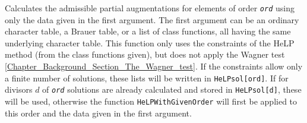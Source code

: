 \documentclass[a4paper,11pt]{report}
\begin{document}
{{{ Calculates the admissible partial augmentations for elements of order \mbox{\texttt{\mdseries\slshape ord}} using only the data given in the first argument. The first argument can be an
ordinary character table, a Brauer table, or a list of class functions, all
having the same underlying character table. This function only uses the
constraints of the HeLP method (from the class functions given), but does not
apply the Wagner test \ref{Chapter_Background_Section_The_Wagner_test}. If the constraints allow only a finite number of solutions, these lists will
be written in \texttt{HeLP{\textunderscore}sol[ord]}. If for divisors $d$ of \mbox{\texttt{\mdseries\slshape ord}} solutions are already calculated and stored in \texttt{HeLP{\textunderscore}sol[d]}, these will be used, otherwise the function \texttt{HeLP{\textunderscore}WithGivenOrder} will first be applied to this order and the data given in the first argument. }

}}
\end{document}
